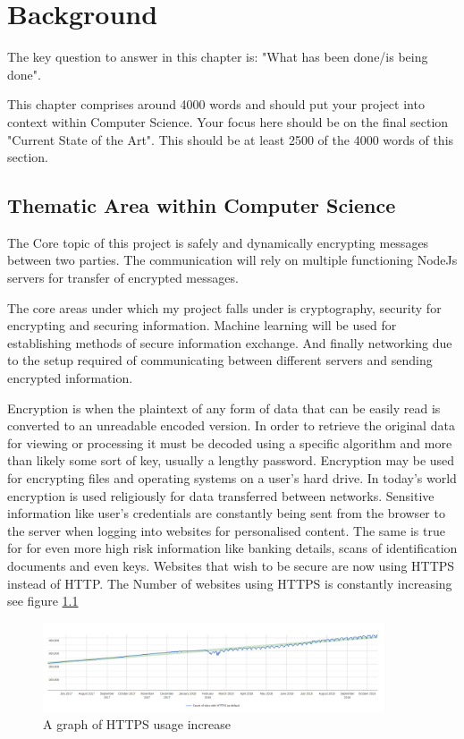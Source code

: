 \chapter{Background}
\label{chap:background}
The key question to answer in this chapter is: "What has been done/is being done". 

This chapter comprises around 4000 words and should put your project into context within Computer Science. Your focus here should be on the final section "Current State of the Art". This should be at least 2500 of the 4000 words of this section.

\section{Thematic Area within Computer Science}
The Core topic of this project is safely and dynamically encrypting messages between two parties. The communication will rely on multiple functioning NodeJs servers for transfer of encrypted messages. 

The core areas under which my project falls under is cryptography, security for encrypting and securing information. Machine learning will be used for establishing methods of secure information exchange. And finally networking due to the setup required of communicating between different servers and sending encrypted information.

Encryption \cite{encryptionDefinition} is when the plaintext of any form of data that can be easily read is converted to an unreadable encoded version. In order to retrieve the original data for viewing or processing it must be decoded using a specific algorithm and more than likely some sort of key, usually a lengthy password. Encryption may be used for encrypting files and operating systems on a user's hard drive. In today's world encryption is used religiously for data transferred between networks. Sensitive information like user's credentials are constantly being sent from the browser to the server when logging into websites for personalised content. The same is true for for even more high risk information like banking details, scans of identification documents and even keys. Websites that wish to be secure are now using HTTPS instead of HTTP. The Number of websites using HTTPS is constantly increasing see figure \ref{fig:httpsRise}

\begin{figure}[ht]
  \centering
      \includegraphics[width=0.9\textwidth]{Figures/httpsRise.png}
  \caption[A graph of HTTPS usage increase]{A graph of HTTPS usage increase\cite{https}}
  \label{fig:httpsRise}
\end{figure}

